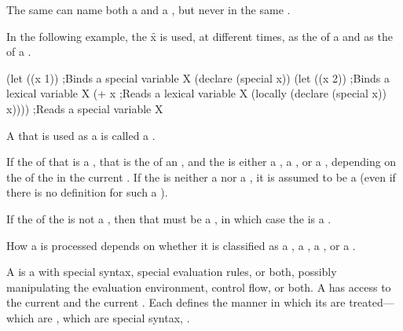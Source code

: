 The same  can name both 
    a  
and a ,
but never in the same .

In the following example, the  \f{x} is used,
at different times, 
    as the  of a 
and as the  of a .
 
\code
 (let ((x 1))            ;Binds a special variable X
   (declare (special x))
   (let ((x 2))          ;Binds a lexical variable X
     (+ x                ;Reads a lexical variable X
        (locally (declare (special x))
                 x))))   ;Reads a special variable X
\endcode

\endsubsubsubsubsection%

\endsubsubsubsection%


A  that is used as a  is called a .

If the  of that  is a , 
that  is the  of an ,
and the  is either a , a ,
or a , depending on the   
of the  in the current .
If the  is neither a 
nor a , it is assumed to be a 
(even if there is no definition for such a ).

If the  of the  is not a ,
then that  must be a ,
in which case the  is a .

How a  is processed depends on whether it is 
classified as a , a , 
a , or a .


A  is a  with special syntax,
special evaluation rules, or both, possibly manipulating the
evaluation environment, control flow, or both.
A  has access to
    the current  
and the current .
Each  defines the manner in which its 
are treated---which are , which are special syntax, \etc.

